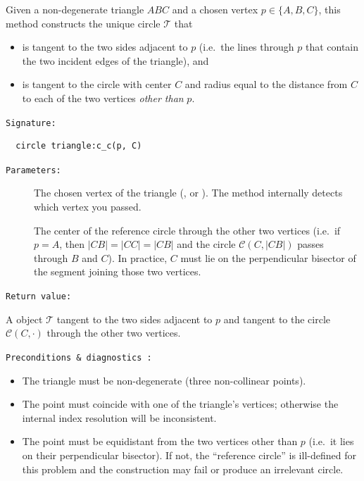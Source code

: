 Given a non-degenerate triangle $ABC$ and a chosen vertex $p\in\{A,B,C\}$, this method constructs the unique circle $\mathcal{T}$ that
\begin{itemize}
  \item is tangent to the two sides adjacent to $p$ (i.e.\ the lines through $p$ that contain the two incident edges of the triangle), and
  \item is tangent to the circle with center $C$ and radius equal to the distance from \(C\) to each of the two vertices \emph{other than} $p$.
\end{itemize}

\texttt{Signature: }

\begin{verbatim}
  circle triangle:c_c(p, C)
\end{verbatim}

\texttt{Parameters: }

\begin{description}
  \item[] The chosen vertex of the triangle (,  or ). The method internally detects which vertex you passed.
  \item[] The center of the reference circle through the other two vertices (i.e.\ if \(p=A\), then \(|CB|=|CC|=|C\!B|\) and the circle \(\mathcal{C}(C,|CB|)\) passes through \(B\) and \(C\)). In practice, \(C\) must lie on the perpendicular bisector of the segment joining those two vertices.
\end{description}

\texttt{Return value: }

A  object $\mathcal{T}$ tangent to the two sides adjacent to \(p\) and tangent to the circle $\mathcal{C}(C,\cdot)$ through the other two vertices.


\texttt{Preconditions \& diagnostics :}

\begin{itemize}
  \item The triangle must be non-degenerate (three non-collinear points).
  \item The point  must coincide with one of the triangle’s vertices; otherwise the internal index resolution will be inconsistent.
  \item The point  must be equidistant from the two vertices other than \(p\) (i.e.\ it lies on their perpendicular bisector). If not, the “reference circle” is ill-defined for this problem and the construction may fail or produce an irrelevant circle.
\end{itemize}

